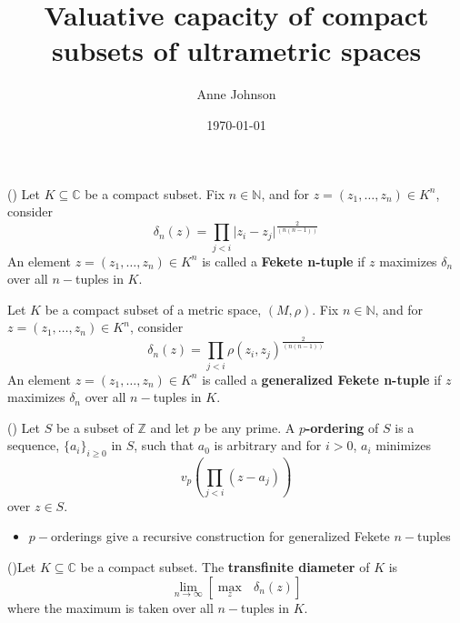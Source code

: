 \documentclass{beamer}
\title{Valuative capacity of compact subsets of ultrametric spaces}
\author{Anne Johnson}
\date{\today}
\theoremstyle{definition}
\begin{document}
\maketitle

\begin{frame}
\begin{definition}	
(\cite{fek}) Let $K \subseteq \mathbb{C}$ be a compact subset. Fix $n \in \mathbb{N}$, and for $z = (z_1,\ldots,z_n) \in K^n$, consider
\[\delta_n(z) = \prod_{j < i} \lvert z_i - z_j \rvert^{\frac{2}{(n(n-1))}} \]
An element $z = (z_1,\ldots,z_n) \in K^n$ is called a \textbf{Fekete n-tuple} if $z$ maximizes $\delta_n$ over all $n-$tuples in $K$.
\end{definition}

\end{frame}

\begin{frame}
	\begin{definition}	
		\cite{fek} Let $K$ be a compact subset of a metric space, $(M,\rho)$. Fix $n \in \mathbb{N}$, and for $z = (z_1,\ldots,z_n) \in K^n$, consider
		\[\delta_n(z) = \prod_{j < i} \rho(z_i, z_j)^{\frac{2}{(n(n-1))}} \]
		An element $z = (z_1,\ldots,z_n) \in K^n$ is called a \textbf{generalized Fekete n-tuple} if $z$ maximizes $\delta_n$ over all $n-$tuples in $K$.
	\end{definition}
\end{frame}

\begin{frame}
 \begin{definition}
		(\cite{mb1}) Let $S$ be a subset of $\mathbb{Z}$  and let $p$ be any prime. A \textbf{$p$-ordering} of $S$ is a sequence, $\{a_i\}_{i\geq 0}$ in $S$, such that $a_0$ is arbitrary and for $i >0$, $a_i$ minimizes 
		\[ v_p (\prod_{j < i} (z - a_j) )\] over $z \in S$.\\
 \end{definition}
	\pause
 \begin{itemize}
		\item $p-$orderings give a recursive construction for generalized Fekete $n-$tuples\only<+->{!}  
 \end{itemize}	
\end{frame}

\begin{frame}
\begin{definition}	
	(\cite{fek})Let $K \subseteq \mathbb{C}$ be a compact subset. The \textbf{transfinite diameter} of $K$ is \[ \lim_{n\to\infty} [ \max_z \text{ } \delta_n(z)]\] where the maximum is taken over all $n-$tuples in $K$. %
\end{definition}
\end{frame}
\end{document}
